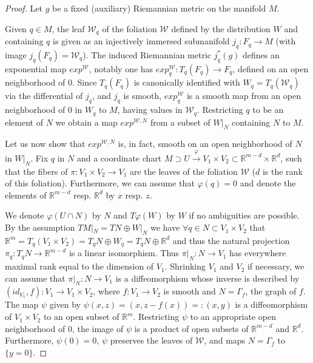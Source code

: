 \documentclass[a4paper,12pt,leqno]{article}
\begin{document}
\begin{proof}
Let $g$ be a fixed (auxiliary) Riemannian metric on the manifold $M$.\newline

\noindent Given $q\in M$, the leaf $\mathcal{W}_q$ of the foliation $\mathcal{W}$ defined by the distribution $W$ and containing $q$ is given 
as an injectively immersed submanifold $j_q:F_q\rightarrow M$ (with image $j_q(F_q)=\mathcal{W}_q$). The induced Riemannian 
metric $j_q^{*}(g)$ defines an exponential map $exp^{\mathcal{W}}$, notably one has $exp^{\mathcal{W}}_q:T_q(F_q)\rightarrow F_q$, 
defined on an open neighborhood of 0. Since $T_q(F_q)$ is canonically identified with $W_q=T_q(\mathcal{W}_q)$ via the differential of $j_q$, 
and $j_q$ is smooth, $exp^{\mathcal{W}}_q$ is a smooth map from an open neighborhood of 0 in $W_q$ to $M$, having values in 
$\mathcal{W}_q$. Restricting $q$ to be an element of $N$ we obtain a map $exp^{\mathcal{W},N}$ from a subset of $W|_N$ containing 
$N$ to $M$. 

Let us now show that $exp^{\mathcal{W},N}$ is, in fact, smooth on an open neighborhood of $N$ in $W|_N$. Fix $q$ in $ N$ and a 
coordinate chart $M\supset U\xrightarrow{\varphi} V_1\times V_2\subset \mathbb{R}^{m-d}\times\mathbb{R}^d$, such that the fibers 
of $\pi:V_1\times V_2\rightarrow V_1$ are the leaves of the foliation $\mathcal{W}$ ($d$ is the rank of this foliation). Furthermore, 
we can assume that $\varphi(q)=0$ and denote the elements of $\mathbb{R}^{m-d}$ resp. $\mathbb{R}^d$ by $x$ resp. $z$. 

We denote $\varphi(U\cap N)$ by $N$ and $T\varphi(W)$ by $W$ if no ambiguities are possible. By the assumption 
$TM|_N=TN\oplus W|_N$ we have $\forall q \in N \subset V_1\times V_2$ that $\mathbb{R}^m=T_q(V_1\times V_2)=
T_qN\oplus W_q=T_qN\oplus \mathbb{R}^d$ and thus the natural projection $\pi_q: T_qN\rightarrow \mathbb{R}^{m-d}$ 
is a linear isomorphism. Thus $\pi\vert_N: N\rightarrow V_1$ has everywhere maximal rank equal to the dimension of $V_1$. 
Shrinking $V_1$ and $V_2$ if necessary, we can assume that $\pi|_N:N\rightarrow V_1$ is a diffeomorphism whose inverse is 
described by $(id_{V_1},f):V_1\rightarrow V_1\times V_2$, where $f:V_1\rightarrow V_2$ is smooth and $N=\Gamma_f$, the 
graph of $f$. The map $\psi$ given by $\psi(x,z)=(x,z-f(x))=:(x,y)$ is a diffeomorphism of $V_1\times V_2$ to an open subset of 
$\mathbb{R}^m$. Restricting $\psi$ to an appropriate open neighborhood of 0, the image of $\psi$ is a product of open subsets 
of $\mathbb{R}^{m-d}$ and $\mathbb{R}^d$. Furthermore, $\psi(0)=0$, $\psi$ preserves the leaves of $\mathcal{W}$, and maps 
$N=\Gamma_f$ to $\{y=0\}$.


\end{proof}
\end{document}
